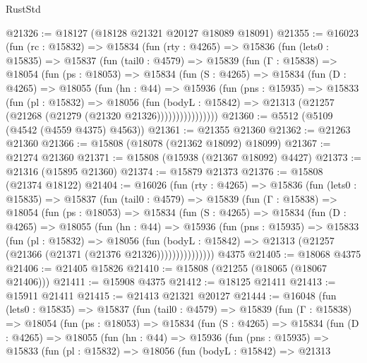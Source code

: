 \begin{lexlean}{RustStd}
\begin{coremodule}
@21326 := @18127 (@18128 @21321 @20127 @18089 @18091)
@21355 := @16023
    (fun (rc : @15832) =>
    @15834
      (fun (rty : @4265) =>
      @15836
        (fun (lets0 : @15835) =>
        @15837
          (fun (tail0 : @4579) =>
          @15839
            (fun (Γ : @15838) =>
            @18054
              (fun (ps : @18053) =>
              @15834
                (fun (S : @4265) =>
                @15834
                  (fun (D : @4265) =>
                  @18055
                    (fun (hn : @44) =>
                    @15936
                      (fun (pns : @15935) =>
                      @15833
                        (fun (pl : @15832) =>
                        @18056
                          (fun (bodyL : @15842) =>
                          @21313 (@21257 (@21268 (@21279 (@21320 @21326))))))))))))))))
@21360 := @5512 (@5109 (@4542 (@4559 @4375) @4563))
@21361 := @21355 @21360
@21362 := @21263 @21360
@21366 := @15808 (@18078 (@21362 @18092) @18099)
@21367 := @21274 @21360
@21371 := @15808 (@15938 (@21367 @18092) @4427)
@21373 := @21316 (@15895 @21360)
@21374 := @15879 @21373
@21376 := @15808 (@21374 @18122)
@21404 := @16026
    (fun (rty : @4265) =>
    @15836
      (fun (lets0 : @15835) =>
      @15837
        (fun (tail0 : @4579) =>
        @15839
          (fun (Γ : @15838) =>
          @18054
            (fun (ps : @18053) =>
            @15834
              (fun (S : @4265) =>
              @15834
                (fun (D : @4265) =>
                @18055
                  (fun (hn : @44) =>
                  @15936
                    (fun (pns : @15935) =>
                    @15833
                      (fun (pl : @15832) =>
                      @18056
                        (fun (bodyL : @15842) =>
                        @21313 (@21257 (@21366 (@21371 (@21376 @21326)))))))))))))))
    @4375
@21405 := @18068 @4375
@21406 := @21405 @15826
@21410 := @15808 (@21255 (@18065 (@18067 @21406)))
@21411 := @15908 @4375
@21412 := @18125 @21411
@21413 := @15911 @21411
@21415 := @21413 @21321 @20127
@21444 := @16048
    (fun (lets0 : @15835) =>
    @15837
      (fun (tail0 : @4579) =>
      @15839
        (fun (Γ : @15838) =>
        @18054
          (fun (ps : @18053) =>
          @15834
            (fun (S : @4265) =>
            @15834
              (fun (D : @4265) =>
              @18055
                (fun (hn : @44) =>
                @15936
                  (fun (pns : @15935) =>
                  @15833
                    (fun (pl : @15832) =>
                    @18056
                      (fun (bodyL : @15842) =>
                      @21313

\end{coremodule}
\end{lexlean}
